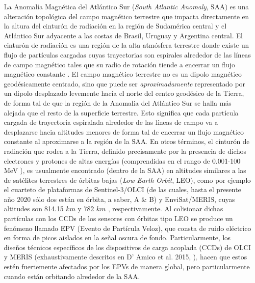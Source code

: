     La Anomalía Magnética del Atlántico Sur (\textit{South Atlantic Anomaly}, SAA) es una alteración topológica del campo magnético terrestre que impacta directamente en la altura del cinturón de radiación en la región de Sudamérica central y el Atlántico Sur adyacente a las costas de Brasil, Uruguay y Argentina central. El cinturón de radiación es una región de la alta atmósfera terrestre donde existe un flujo de partículas cargadas cuyas trayectorias son espirales alrededor de las líneas de campo magnético tales que su radio de rotación tiende a encerrar un flujo magnético constante \cite{sturrock1994}. El campo magnético terrestre no es un dipolo magnético geodésicamente centrado, sino que puede ser \textit{aproximadamente} representado por un dipolo desplazado levemente hacia el norte del centro geodésico de la Tierra, de forma tal de que la región de la Anomalía del Atlántico Sur se halla más alejada que el resto de la superficie terrestre. Esto significa que cada partícula cargada de trayectoria espiralada alrededor de las líneas de campo va a desplazarse hacia altitudes menores de forma tal de encerrar un flujo magnético constante al aproximarse a la región de la SAA. En otros términos, el cinturón de radiación que rodea a la Tierra, definido precisamente por la presencia de dichos electrones y protones de altas energías (comprendidas en el rango de 0.001-100 MeV \cite{cravens1997}), es usualmente encontrado (dentro de la SAA) en altitudes similares a las de satélites terrestres de órbitas bajas \cite{badhwar1999} (\textit{Low Earth Orbit}, LEO), como por ejemplo el cuarteto de plataformas de Sentinel-3/OLCI (de las cuales, hasta el presente año 2020 sólo dos están en órbita, a saber, A \& B) y EnviSat/MERIS, cuyas altitudes son 814.15 $km$ \cite{nieke2004} y 782 $km$ \cite{eumetsat}, respectivamente. 
    Al colisionar dichas partículas con los CCDs de los sensores con órbitas tipo LEO se produce un fenómeno llamado EPV (Evento de Partícula Veloz), que consta de ruido eléctrico en forma de picos aislados en la señal oscura de fondo. Particularmente, los diseños técnicos específicos de los dispositivos de carga acoplada (CCDs) de OLCI y MERIS (exhaustivamente descritos en D' Amico et al. 2015, \cite{damico2015}), hacen que estos estén fuertemente afectados por los EPVs de manera global, pero particularmente cuando están orbitando alrededor de la SAA.
    
